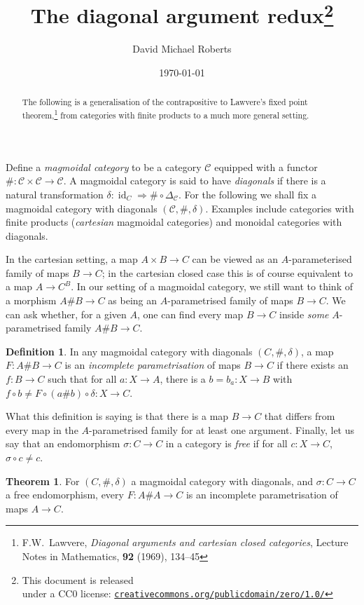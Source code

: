 \documentclass{tufte-handout}
\title{The diagonal argument redux\thanks{This document is released \\ under a CC0 license: \href{http://creativecommons.org/publicdomain/zero/1.0/}{\texttt{creativecommons.org/publicdomain/zero/1.0/}}}}
\author{David Michael Roberts}
\date{\today}
\theoremstyle{definition}
\newtheorem*{definition}{Definition}
\newtheorem*{theorem}{Theorem}
\DeclareMathOperator{\id}{id}
\def\CC{\mathcal{C}}
\begin{document}
\maketitle

\begin{abstract}
The following is a generalisation of the contrapositive to Lawvere's fixed point theorem,\footnote{F.W.~Lawvere, \emph{Diagonal arguments and cartesian closed categories}, Lecture Notes in Mathematics, \textbf{92} (1969), 134--45} from categories with finite products to a much more general setting.\end{abstract}

Define a \emph{magmoidal category} to be a category $\CC$ equipped with a functor $\# \colon \CC\times \CC\to \CC$.
A magmoidal category is said to have \emph{diagonals} if there is a natural transformation $\delta\colon \id_C \Rightarrow \#\circ \Delta_\CC$. 
For the following we shall fix a magmoidal category with diagonals $(\CC,\#,\delta)$.
Examples include categories with finite products (\emph{cartesian} magmoidal categories) and monoidal categories with diagonals.




In the cartesian setting, a map $A\times B \to C$ can be viewed as an $A$-parameterised family of maps $B\to C$; in the cartesian closed case this is of course equivalent to a map $A \to C^B$.
In our setting of a magmoidal category, we still want to think of a morphism $A\# B \to C$ as being an $A$-parametrised family of maps $B\to C$.
We can ask whether, for a given $A$, one can find every map $B\to C$ inside \emph{some} $A$-parametrised family $A\# B \to C$.

\begin{definition}
In any magmoidal category with diagonals $(C,\#,\delta)$, a map $F\colon A\#B\to C$ is an \emph{incomplete parametrisation} of maps $B\to C$ if there exists an $f\colon B\to C$ such that for all $a\colon X\to A$, there is a $b = b_a\colon X\to B$ with $f\circ b \not= F\circ(a\# b)\circ \delta\colon X\to C$.
\end{definition}

\noindent
What this definition is saying is that there is a map $B\to C$ that differs from every map in the $A$-parametrised family for at least one argument.
Finally, let us say that an endomorphism $\sigma\colon C\to C$ in a category is \emph{free} if for all $c\colon X\to C$, $\sigma\circ c \not=c$.

\begin{theorem}
  For $(C,\#,\delta)$ a magmoidal category with diagonals, and $\sigma \colon C\to C$ a free endomorphism, every $F\colon A\# A \to C$ is an incomplete parametrisation of maps $A\to C$.
\end{theorem}
\end{document}
